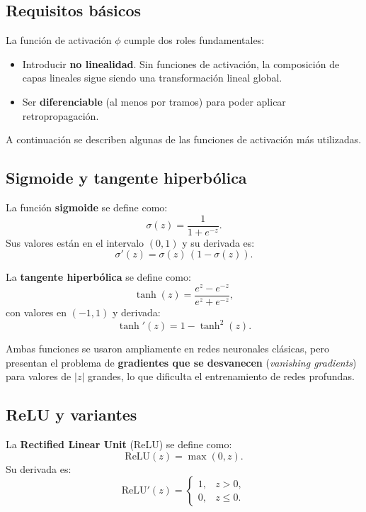 \subsection{Requisitos básicos}

La función de activación $\phi$ cumple dos roles fundamentales:
\begin{itemize}
    \item Introducir \textbf{no linealidad}. Sin funciones de activación, la composición de capas lineales sigue siendo una transformación lineal global.
    \item Ser \textbf{diferenciable} (al menos por tramos) para poder aplicar retropropagación.
\end{itemize}

A continuación se describen algunas de las funciones de activación más utilizadas.

\subsection{Sigmoide y tangente hiperbólica}

La función \textbf{sigmoide} se define como:
\begin{equation}
    \sigma(z) = \frac{1}{1 + e^{-z}}.
\end{equation}
Sus valores están en el intervalo $(0, 1)$ y su derivada es:
\begin{equation}
    \sigma'(z) = \sigma(z) \, (1 - \sigma(z)).
\end{equation}

La \textbf{tangente hiperbólica} se define como:
\begin{equation}
    \tanh(z) = \frac{e^{z} - e^{-z}}{e^{z} + e^{-z}},
\end{equation}
con valores en $(-1, 1)$ y derivada:
\begin{equation}
    \tanh'(z) = 1 - \tanh^2(z).
\end{equation}

Ambas funciones se usaron ampliamente en redes neuronales clásicas, pero presentan el problema de \textbf{gradientes que se desvanecen} (\textit{vanishing gradients}) para valores de $|z|$ grandes, lo que dificulta el entrenamiento de redes profundas.

\subsection{ReLU y variantes}

La \textbf{Rectified Linear Unit} (ReLU) se define como:
\begin{equation}
    \mathrm{ReLU}(z) = \max(0, z).
\end{equation}
Su derivada es:
\[
    \mathrm{ReLU}'(z) =
    \begin{cases}
        1, & z > 0, \\
        0, & z \le 0.
    \end{cases}
\]

